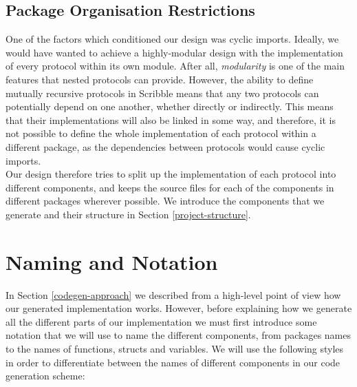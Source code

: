 \documentclass[12pt,twoside]{report}
\begin{document}
\subsection{Package Organisation Restrictions}\label{package-organisation-restrictions}

One of the factors which conditioned our design was cyclic imports. Ideally, we would have wanted to achieve a highly-modular design with the implementation of every protocol within its own module. After all, \textit{modularity} is one of the main features that nested protocols can provide. However, the ability to define mutually recursive protocols in Scribble means that any two protocols can potentially depend on one another, whether directly or indirectly. This means that their implementations will also be linked in some way, and therefore, it is not possible to define the whole implementation of each protocol within a different package, as the dependencies between protocols would cause cyclic imports.\\

Our design therefore tries to split up the implementation of each protocol into different components, and keeps the source files for each of the components in different packages wherever possible. We introduce the components that we generate and their structure in Section \ref{project-structure}.






\section{Naming and Notation}\label{naming-and-notation}
In Section \ref{codegen-approach} we described from a high-level point of view how our generated implementation works. However, before explaining how we generate all the different parts of our implementation we must first introduce some notation that we will use to name the different components, from packages names to the names of functions, structs and variables. We will use the following styles in order to differentiate between the names of different components in our code generation scheme:
\end{document}
